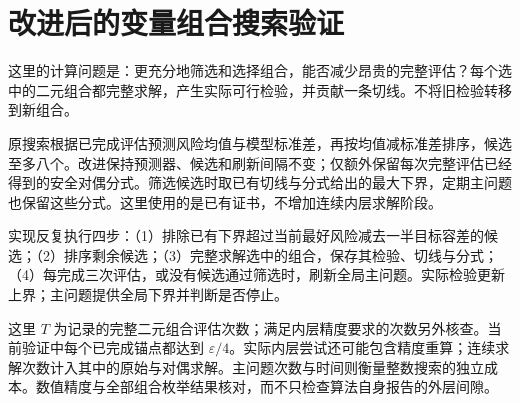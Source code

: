\documentclass[11pt,a4paper]{article}
\begin{document}
\section{改进后的变量组合搜索验证}\label{sec:search}
这里的计算问题是：更充分地筛选和选择组合，能否减少昂贵的完整评估？每个选中的二元组合都完整求解，产生实际可行检验，并贡献一条切线。不将旧检验转移到新组合。

原搜索根据已完成评估预测风险均值与模型标准差，再按均值减标准差排序，候选至多八个。改进保持预测器、候选和刷新间隔不变；仅额外保留每次完整评估已经得到的安全对偶分式。筛选候选时取已有切线与分式给出的最大下界，定期主问题也保留这些分式。这里使用的是已有证书，不增加连续内层求解阶段。

实现反复执行四步：（1）排除已有下界超过当前最好风险减去一半目标容差的候选；（2）排序剩余候选；（3）完整求解选中的组合，保存其检验、切线与分式；（4）每完成三次评估，或没有候选通过筛选时，刷新全局主问题。实际检验更新上界；主问题提供全局下界并判断是否停止。

这里 $T$ 为记录的完整二元组合评估次数；满足内层精度要求的次数另外核查。当前验证中每个已完成锚点都达到 $\varepsilon/4$。实际内层尝试还可能包含精度重算；连续求解次数计入其中的原始与对偶求解。主问题次数与时间则衡量整数搜索的独立成本。数值精度与全部组合枚举结果核对，而不只检查算法自身报告的外层间隙。
\end{document}
